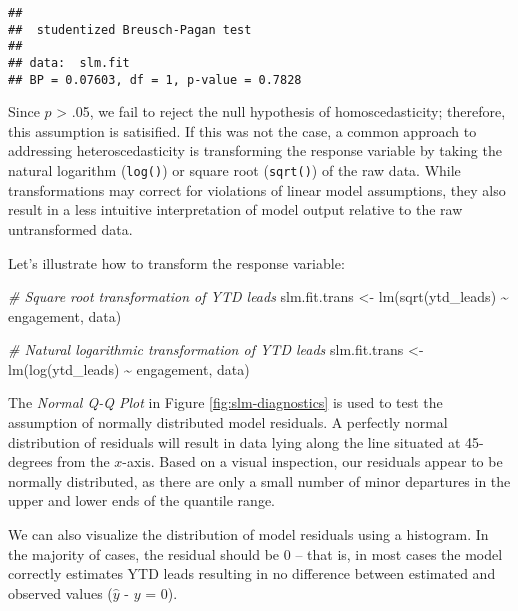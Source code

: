\documentclass[
]{book}
\newenvironment{Shaded}{\begin{snugshade}}{\end{snugshade}}
\newcommand{\CommentTok}[1]{\textcolor[rgb]{0.56,0.35,0.01}{\textit{#1}}}
\newcommand{\FunctionTok}[1]{\textcolor[rgb]{0.00,0.00,0.00}{#1}}
\newcommand{\NormalTok}[1]{#1}
\newcommand{\OtherTok}[1]{\textcolor[rgb]{0.56,0.35,0.01}{#1}}
\newcommand{\SpecialCharTok}[1]{\textcolor[rgb]{0.00,0.00,0.00}{#1}}
\begin{document}
\begin{verbatim}
## 
##  studentized Breusch-Pagan test
## 
## data:  slm.fit
## BP = 0.07603, df = 1, p-value = 0.7828
\end{verbatim}

Since \(p\) \textgreater{} .05, we fail to reject the null hypothesis of homoscedasticity; therefore, this assumption is satisified. If this was not the case, a common approach to addressing heteroscedasticity is transforming the response variable by taking the natural logarithm (\texttt{log()}) or square root (\texttt{sqrt()}) of the raw data. While transformations may correct for violations of linear model assumptions, they also result in a less intuitive interpretation of model output relative to the raw untransformed data.

Let's illustrate how to transform the response variable:

\begin{Shaded}
\begin{Highlighting}[]
\CommentTok{\# Square root transformation of YTD leads}
\NormalTok{slm.fit.trans }\OtherTok{\textless{}{-}} \FunctionTok{lm}\NormalTok{(}\FunctionTok{sqrt}\NormalTok{(ytd\_leads) }\SpecialCharTok{\textasciitilde{}}\NormalTok{ engagement, data)}

\CommentTok{\# Natural logarithmic transformation of YTD leads}
\NormalTok{slm.fit.trans }\OtherTok{\textless{}{-}} \FunctionTok{lm}\NormalTok{(}\FunctionTok{log}\NormalTok{(ytd\_leads) }\SpecialCharTok{\textasciitilde{}}\NormalTok{ engagement, data)}
\end{Highlighting}
\end{Shaded}

The \emph{Normal Q-Q Plot} in Figure \ref{fig:slm-diagnostics} is used to test the assumption of normally distributed model residuals. A perfectly normal distribution of residuals will result in data lying along the line situated at 45-degrees from the \(x\)-axis. Based on a visual inspection, our residuals appear to be normally distributed, as there are only a small number of minor departures in the upper and lower ends of the quantile range.

We can also visualize the distribution of model residuals using a histogram. In the majority of cases, the residual should be 0 -- that is, in most cases the model correctly estimates YTD leads resulting in no difference between estimated and observed values (\(\hat{y}\) - \(y\) = 0).
\end{document}
